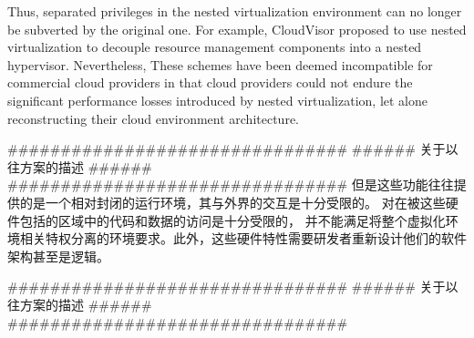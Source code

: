 Thus, separated privileges in the nested virtualization environment can no longer be subverted by the original one. For example, CloudVisor \cite{Zhang2011CloudVisor} proposed to use nested virtualization to decouple resource management components into a nested hypervisor. 
Nevertheless, These schemes have been deemed incompatible for commercial cloud providers in that cloud providers could not endure the significant performance losses introduced by nested virtualization, let alone reconstructing their cloud environment architecture.


\iffalse
################################
###### 关于以往方案的描述 ######
################################
但是这些功能往往提供的是一个相对封闭的运行环境，其与外界的交互是十分受限的。
对在被这些硬件包括的区域中的代码和数据的访问是十分受限的，
并不能满足将整个虚拟化环境相关特权分离的环境要求。此外，这些硬件特性需要研发者重新设计他们的软件架构甚至是逻辑。

################################
###### 关于以往方案的描述 ######
################################

